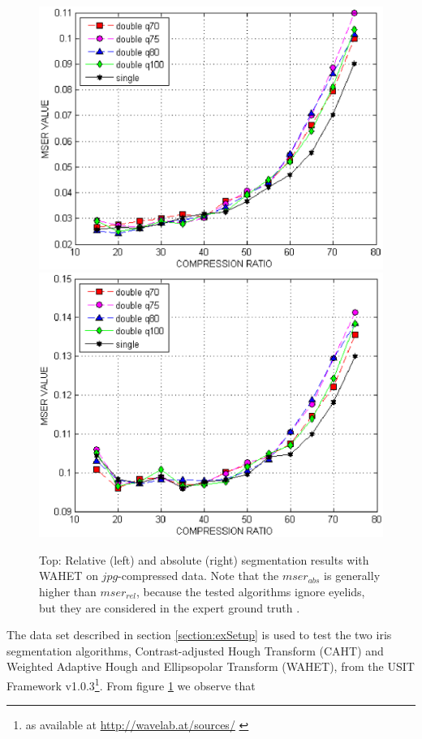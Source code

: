 \documentclass[10pt,twocolumn,letterpaper]{article}
\begin{document}
\begin{figure}[h]
	\begin{center}
		
	\includegraphics[width=0.49\linewidth]{img/mser/jpeg_wahet}
	\includegraphics[width=0.49\linewidth]{img/mser/abs_mser_wahet_jpeg}
	
\end{center}
	\caption{Top: Relative (left) and absolute (right) segmentation results with WAHET on $jpg$-compressed data. Note that the $mser_{abs}$ is generally higher than $mser_{rel}$, because the tested algorithms ignore eyelids, but they are considered in the expert ground truth \cite{severeCompression}.}
	\label{fig:segResults}
	
\end{figure}

The data set described in section \ref{section:exSetup} is used to test the two iris segmentation algorithms, Contrast-adjusted Hough Transform (CAHT) and Weighted Adaptive Hough and Ellipsopolar Transform (WAHET), from the USIT Framework v1.0.3\footnote{as available at \url{http://wavelab.at/sources/} \cite{rathgeb}}. From figure \ref{fig:segResults} we observe that
\end{document}
